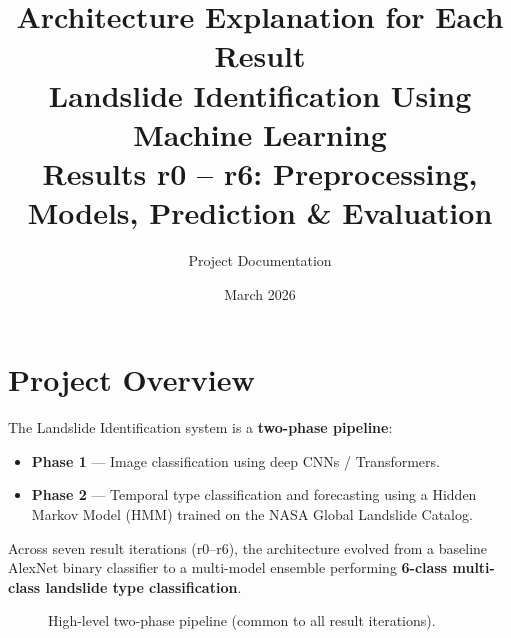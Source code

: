 \documentclass[12pt,a4paper]{article}
\title{\textbf{Architecture Explanation for Each Result}\\[0.3em]
       \large Landslide Identification Using Machine Learning\\
       Results r0 -- r6: Preprocessing, Models, Prediction \& Evaluation}
\author{Project Documentation}
\date{March 2026}
\begin{document}
\maketitle
\tableofcontents
\newpage

\section{Project Overview}

The Landslide Identification system is a \textbf{two-phase pipeline}:
\begin{itemize}[nosep]
  \item \textbf{Phase 1} --- Image classification using deep CNNs / Transformers.
  \item \textbf{Phase 2} --- Temporal type classification and forecasting using a Hidden Markov Model (HMM) trained on the NASA Global Landslide Catalog.
\end{itemize}

Across seven result iterations (r0--r6), the architecture evolved from a baseline AlexNet binary classifier to a multi-model ensemble performing \textbf{6-class multi-class landslide type classification}.

\begin{figure}[H]
\centering
{}
\caption{High-level two-phase pipeline (common to all result iterations).}
\end{figure}


\newpage
\end{document}
